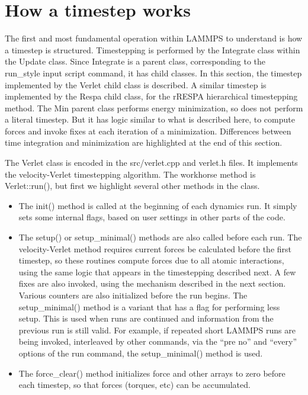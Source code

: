 \documentclass{article}
\begin{document}

\pagebreak
\section{How a timestep works}

The first and most fundamental operation within LAMMPS to understand
is how a timestep is structured.  Timestepping is performed by the
Integrate class within the Update class.  Since Integrate is a parent
class, corresponding to the run\_style input script command, it has
child classes.  In this section, the timestep implemented by the
Verlet child class is described.  A similar timestep is implemented by
the Respa child class, for the rRESPA hierarchical timestepping
method.  The Min parent class performs energy minimization, so does
not perform a literal timestep.  But it has logic similar to what is
described here, to compute forces and invoke fixes at each iteration
of a minimization.  Differences between time integration and
minimization are highlighted at the end of this section.

The Verlet class is encoded in the src/verlet.cpp and verlet.h files.
It implements the velocity-Verlet timestepping algorithm.  The
workhorse method is Verlet::run(), but first we highlight several
other methods in the class.

\begin{itemize}

\item The init() method is called at the beginning of each dynamics
  run.  It simply sets some internal flags, based on user settings in
  other parts of the code.

\item The setup() or setup\_minimal() methods are also called before
  each run.  The velocity-Verlet method requires current forces be
  calculated before the first timestep, so these routines compute
  forces due to all atomic interactions, using the same logic that
  appears in the timestepping described next.  A few fixes are also
  invoked, using the mechanism described in the next section.  Various
  counters are also initialized before the run begins.  The
  setup\_minimal() method is a variant that has a flag for performing
  less setup.  This is used when runs are continued and information
  from the previous run is still valid.  For example, if repeated
  short LAMMPS runs are being invoked, interleaved by other commands,
  via the ``pre no'' and ``every'' options of the run command, the
  setup\_minimal() method is used.

\item The force\_clear() method initializes force and other arrays to
  zero before each timestep, so that forces (torques, etc) can be
  accumulated.

\end{itemize}
\end{document}
